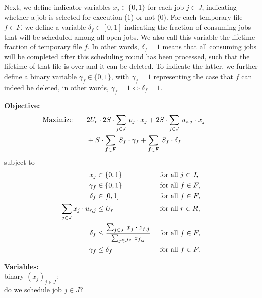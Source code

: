\documentclass[10pt,a4paper,twocolumn]{article}
\begin{document}
Next, we define indicator variables $x_j \in \{0,1\}$ for each job $j \in J$, indicating whether a job is selected for execution ($1$) or not ($0$).
For each temporary file $f \in F$, we define a variable $\delta_f \in [0,1]$ indicating the fraction of consuming jobs that will be scheduled among all open jobs.
We also call this variable the lifetime fraction of temporary file $f$.
In other words, $\delta_f = 1$ means that all consuming jobs will be completed after this scheduling round has been processed, such that the lifetime of that file is over and it can be deleted.
To indicate the latter, we further define a binary variable $\gamma_f \in \{0,1\}$, with $\gamma_f = 1$ representing the case that $f$ can indeed be deleted, in other words, $\gamma_f = 1 \Leftrightarrow \delta_f = 1$.


\begin{table}
\begin{minipage}[t]{0.54\textwidth}
\textbf{Objective:}
\begin{align}
\text{Maximize}\qquad
    & 2U_{\text{c}} \cdot 2S \cdot \sum_{j \in J}\, p_j \cdot x_j
  +   2S \cdot \sum_{j \in J}\, u_{\text{c},j} \cdot x_j \qquad \nonumber \\
&{}+   S \cdot \sum_{f \in F}\, S_f \cdot \gamma_f
  +   \sum_{f \in F}\, S_f \cdot \delta_f  \label{objective}
\end{align}
\hspace{0.6cm}subject to
\begin{align}
x_j & \in \{0,1\} && \text{ for all } j \in J, \nonumber \\
\gamma_f & \in \{0,1\} && \text{ for all } f \in F, \nonumber \\ 
\delta_f & \in [0,1] && \text{ for all } f \in F, \nonumber \\
\sum_{j \in J} x_j \cdot u_{r,j} &\leq U_r && \text{ for all } r \in R,
    \label{cn:resources}\\
\delta_f & \leq \frac{\sum_{j \in J}\, x_j \cdot z_{f,j}}{\sum_{j \in J^o}\, z_{f,j}} && \text{ for all } f \in F,
    \label{cn:lifetmp}\\
\gamma_f &\leq \delta_f && \text{ for all } f \in F.
    \label{cn:deltmp}
\end{align}
\end{minipage}\qquad
\begin{minipage}[t]{0.44\textwidth}
\textbf{Variables:}\\[1ex]
binary $(x_j)_{j\in J}$: \\
do we schedule job $j\in J$? \\[1ex]

\end{minipage}
\end{table}
\end{document}
